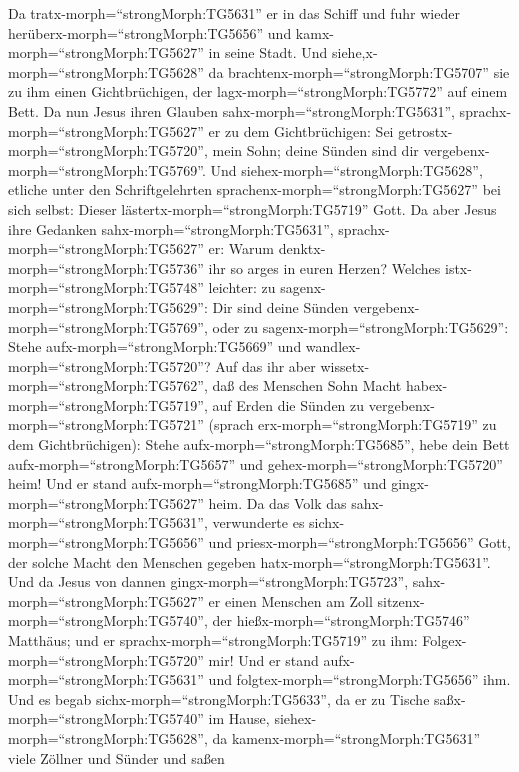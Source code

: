  Da tratx-morph=``strongMorph:TG5631'' er in das Schiff und
fuhr wieder herüberx-morph=``strongMorph:TG5656'' und
kamx-morph=``strongMorph:TG5627'' in seine Stadt.  Und
siehe,x-morph=``strongMorph:TG5628'' da
brachtenx-morph=``strongMorph:TG5707'' sie zu ihm einen Gichtbrüchigen,
der lagx-morph=``strongMorph:TG5772'' auf einem Bett. Da nun Jesus ihren
Glauben sahx-morph=``strongMorph:TG5631'',
sprachx-morph=``strongMorph:TG5627'' er zu dem Gichtbrüchigen: Sei
getrostx-morph=``strongMorph:TG5720'', mein Sohn; deine Sünden sind dir
vergebenx-morph=``strongMorph:TG5769''.  Und
siehex-morph=``strongMorph:TG5628'', etliche unter den Schriftgelehrten
sprachenx-morph=``strongMorph:TG5627'' bei sich selbst: Dieser
lästertx-morph=``strongMorph:TG5719'' Gott.  Da aber Jesus
ihre Gedanken sahx-morph=``strongMorph:TG5631'',
sprachx-morph=``strongMorph:TG5627'' er: Warum
denktx-morph=``strongMorph:TG5736'' ihr so arges in euren Herzen?
 Welches istx-morph=``strongMorph:TG5748'' leichter: zu
sagenx-morph=``strongMorph:TG5629'': Dir sind deine Sünden
vergebenx-morph=``strongMorph:TG5769'', oder zu
sagenx-morph=``strongMorph:TG5629'': Stehe
aufx-morph=``strongMorph:TG5669'' und
wandlex-morph=``strongMorph:TG5720''?  Auf das ihr aber
wissetx-morph=``strongMorph:TG5762'', daß des Menschen Sohn Macht
habex-morph=``strongMorph:TG5719'', auf Erden die Sünden zu
vergebenx-morph=``strongMorph:TG5721'' (sprach
erx-morph=``strongMorph:TG5719'' zu dem Gichtbrüchigen): Stehe
aufx-morph=``strongMorph:TG5685'', hebe dein Bett
aufx-morph=``strongMorph:TG5657'' und gehex-morph=``strongMorph:TG5720''
heim!  Und er stand aufx-morph=``strongMorph:TG5685'' und
gingx-morph=``strongMorph:TG5627'' heim.  Da das Volk das
sahx-morph=``strongMorph:TG5631'', verwunderte es
sichx-morph=``strongMorph:TG5656'' und
priesx-morph=``strongMorph:TG5656'' Gott, der solche Macht den Menschen
gegeben hatx-morph=``strongMorph:TG5631''.  Und da Jesus von
dannen gingx-morph=``strongMorph:TG5723'',
sahx-morph=``strongMorph:TG5627'' er einen Menschen am Zoll
sitzenx-morph=``strongMorph:TG5740'', der
hießx-morph=``strongMorph:TG5746'' Matthäus; und er
sprachx-morph=``strongMorph:TG5719'' zu ihm:
Folgex-morph=``strongMorph:TG5720'' mir! Und er stand
aufx-morph=``strongMorph:TG5631'' und
folgtex-morph=``strongMorph:TG5656'' ihm.  Und es begab
sichx-morph=``strongMorph:TG5633'', da er zu Tische
saßx-morph=``strongMorph:TG5740'' im Hause,
siehex-morph=``strongMorph:TG5628'', da
kamenx-morph=``strongMorph:TG5631'' viele Zöllner und Sünder und saßen
